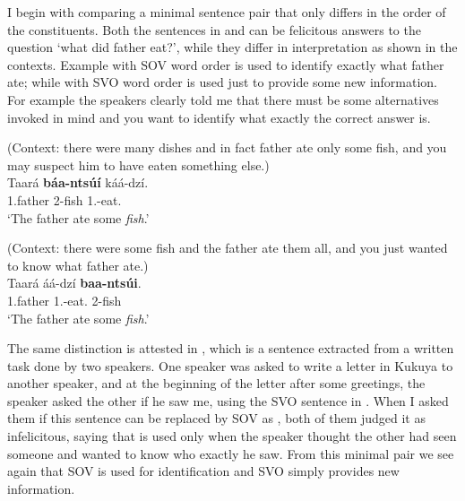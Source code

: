 \documentclass[output=paper,colorlinks,citecolor=brown,
]{langscibook}
\begin{document}
I begin with comparing a minimal sentence pair that only differs in the order of the constituents. Both the sentences in  and  can be felicitous answers to the question `what did father eat?', while they differ in interpretation as shown in the contexts. Example  with SOV word order is used to identify exactly what father ate; while  with SVO word order is used just to provide some new information. For example  the speakers clearly told me that there must be some alternatives invoked in mind and you want to identify what exactly the correct answer is.
\begin{exe} 
     \ex \label{75}
    \begin{xlist}
\ex
\label{75a}
 (Context: there were many dishes and in fact father ate only some fish, and you may suspect him to have eaten something else.) \\
\gll
Taará \textbf{báa-ntsúí} káá-dzí.\\
1.father 2-fish 1\Sm{}.\Pst{}-eat.\Pst{}\\
\trans ‘The father ate some \textit{fish}.’

\ex
\label{75b}
 (Context: there were some fish and the father ate them all, and you just wanted to know what father ate.) \\
\gll
Taará áá-dzí \textbf{baa-ntsúi}.\\
1.father 1\Sm{}.\Pst{}-eat.\Pst{} 2-fish\\
\trans ‘The father ate some \textit{fish}.’

    \end{xlist}
\end{exe}
The same distinction is attested in , which is a sentence extracted from a written task done by two speakers. One speaker was asked to write a letter in Kukuya to another speaker, and at the beginning of the letter after some greetings, the speaker asked the other if he saw me, using the SVO sentence in . When I asked them if this sentence can be replaced by SOV as , both of them judged it as infelicitous, saying that  is used only when the speaker thought the other had seen someone and wanted to know who exactly he saw. From this minimal pair we see again that SOV is used for identification and SVO simply provides new information.
\end{document}
